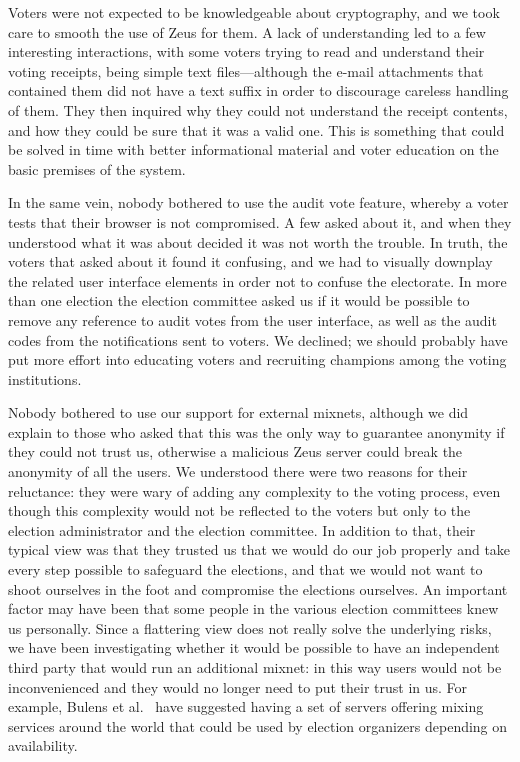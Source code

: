 \documentclass[letterpaper,10pt]{article}
\begin{document}
Voters were not expected to be knowledgeable about cryptography, and
we took care to smooth the use of Zeus for them. A lack of
understanding led to a few interesting interactions, with some voters
trying to read and understand their voting receipts, being simple text
files---although the e-mail attachments that contained them did not
have a text suffix in order to discourage careless handling of them.
They then inquired why they could not understand the receipt contents,
and how they could be sure that it was a valid one. This is something
that could be solved in time with better informational material and
voter education on the basic premises of the system.

In the same vein, nobody bothered to use the audit vote feature,
whereby a voter tests that their browser is not compromised. A few
asked about it, and when they understood what it was about decided it
was not worth the trouble. In truth, the voters that asked about it
found it confusing, and we had to visually downplay the related user
interface elements in order not to confuse the electorate. In more
than one election the election committee asked us if it would be
possible to remove any reference to audit votes from the user
interface, as well as the audit codes from the notifications sent to
voters. We declined; we should probably have put more effort into
educating voters and recruiting champions among the voting
institutions. 

Nobody bothered to use our support for external mixnets,
although we did explain to those who asked that this was the only way
to guarantee anonymity if they could not trust us, otherwise a
malicious Zeus server could break the anonymity of all the users. We
understood there were two reasons for their reluctance: they were wary
of adding any complexity to the voting process, even though this
complexity would not be reflected to the voters but only to the
election administrator and the election committee. In addition to
that, their typical view was that they trusted us that we would do our
job properly and take every step possible to safeguard the elections,
and that we would not want to shoot ourselves in the foot and
compromise the elections ourselves. An important factor may have been
that some people in the various election committees knew us
personally. Since a flattering view does not really solve the
underlying risks, we have been investigating whether it would be
possible to have an independent third party that would run an
additional mixnet: in this way users would not be inconvenienced and
they would no longer need to put their trust in us. For example,
Bulens et al.~\cite{bulens:2011} have suggested having a set of
servers offering mixing services around the world that could be used
by election organizers depending on availability.
\end{document}
